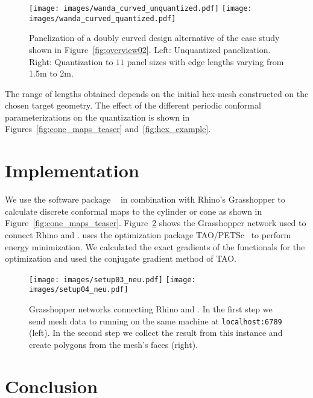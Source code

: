 \documentclass[Thesis.tex]{subfiles}
\begin{document}
\begin{figure}[tbp]
  \centering
  \texttt{[image: images/wanda\_curved\_unquantized.pdf]}
  \texttt{[image: images/wanda\_curved\_quantized.pdf]}
  \caption{Panelization of a doubly curved design alternative of the
    case study shown in Figure~\ref{fig:overview02}. Left: Unquantized
    panelization.  Right: Quantization to $11$ panel sizes with edge
    lengths varying from 1.5m to 2m.}
  \label{fig:quantization}
\end{figure}

The range of lengths obtained depends on the initial hex-mesh
constructed on the chosen target geometry. The effect of the
different periodic conformal parameterizations on the quantization is
shown in Figures~\ref{fig:cone_maps_teaser} and~\ref{fig:hex_example}.


\section{Implementation}
\label{sec:implementation}

We use the software package \VaryLab~\cite{varylab-web-page} in
combination with Rhino's Grasshopper to calculate discrete conformal
maps to the cylinder or cone as shown in Figure~\ref{fig:cone_maps_teaser}.
Figure~\ref{fig:grasshopper} shows the Grasshopper network used to
connect Rhino and \VaryLab.
\VaryLab uses the optimization package {\sc TAO/PETSc}~\cite{tao-user-ref, 
petsc-web-page, jpetsctao-web-page} to perform energy
minimization.
%
We calculated the exact gradients of the functionals for the
optimization and used the conjugate gradient method of {\sc TAO}.

\begin{figure}[tb]
	\texttt{[image: images/setup03\_neu.pdf]}
	\hspace{0.06\textwidth}
	\texttt{[image: images/setup04\_neu.pdf]}
	\caption{Grasshopper networks connecting Rhino and
          \VaryLab{}. In the first step we send mesh data to \VaryLab{}
          running on the same machine at {\tt localhost:6789}
          (left). In the second step we collect the result from this
          \VaryLab{} instance and create polygons from the mesh's
          faces (right).}
	\label{fig:grasshopper}
\end{figure}


\section{Conclusion}
\label{sec:conclusion}
\end{document}
